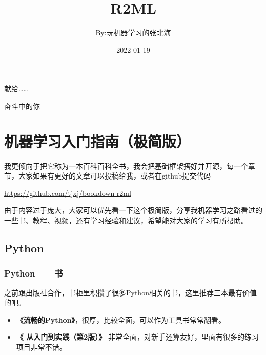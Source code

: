 \documentclass[]{ctexbook}
\title{R2ML}
\author{By:玩机器学习的张北海}
\date{2022-01-19}
\providecommand{\tightlist}{%
  \setlength{\itemsep}{0pt}\setlength{\parskip}{0pt}}
\begin{document}
\maketitle


\thispagestyle{empty}

\begin{center}
献给……

奋斗中的你
\end{center}

\setlength{\abovedisplayskip}{-5pt}
\setlength{\abovedisplayshortskip}{-5pt}

{
\setcounter{tocdepth}{2}
\tableofcontents
}
\listoftables
\listoffigures
\hypertarget{ux673aux5668ux5b66ux4e60ux5165ux95e8ux6307ux5357ux6781ux7b80ux7248}{%
\chapter{机器学习入门指南（极简版）}\label{ux673aux5668ux5b66ux4e60ux5165ux95e8ux6307ux5357ux6781ux7b80ux7248}}

我更倾向于把它称为一本百科百科全书，我会把基础框架搭好并开源，每一个章节，大家如果有更好的文章可以投稿给我，或者在github提交代码

\url{https://github.com/tjxj/bookdown-r2ml}

由于内容过于庞大，大家可以优先看一下这个极简版，分享我机器学习之路看过的一些书、教程、视频，还有学习经验和建议，希望能对大家的学习有所帮助。

\hypertarget{python}{%
\section{Python}\label{python}}

\hypertarget{pythonux4e66}{%
\subsection{Python------书}\label{pythonux4e66}}

之前跟出版社合作，书柜里积攒了很多Python相关的书，这里推荐三本最有价值的吧。

\begin{itemize}
\tightlist
\item
  \textbf{《流畅的Python》}，很厚，比较全面，可以作为工具书常常翻看。
\end{itemize}

\begin{itemize}
\tightlist
\item
  \textbf{《 从入门到实践（第2版）》} 非常全面，对新手还算友好，里面有很多的练习项目非常不错。
\end{itemize}
\end{document}
